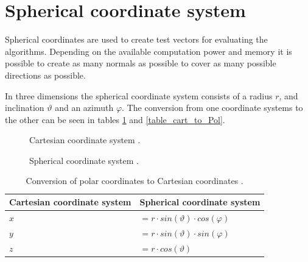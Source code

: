 \section{Spherical coordinate system}
Spherical coordinates are used to create test vectors for evaluating the algorithms. Depending on the available computation power and memory it is possible to create as many normals as possible to cover as many possible directions as possible.

\bigskip
In three dimensions the spherical coordinate system consists of a radius $r$, and inclination $\vartheta$ and an azimuth $\varphi$. The conversion from one coordinate systems to the other can be seen in tables \ref{table_pol_to_cart} and \ref{table_cart_to_Pol}.

\begin{figure}[H]
  \centering
  \begin{minipage}[b]{0.45\textwidth}
    \centering
  \caption{Cartesian coordinate system \cite{Prof.Dr.-Ing.GertF.Trommer2013FelderWellen}.}
  \end{minipage}
  \hfill
  \begin{minipage}[b]{0.45\textwidth}
    \centering
  \caption{Spherical coordinate system \cite{Prof.Dr.-Ing.GertF.Trommer2013FelderWellen}.}
  \end{minipage}
    \hfill
\label{polar_cart_systems}
\end{figure}




\begin{table}[H]
\centering
\begin{tabular}{|ll|}
\hline
\textbf{Cartesian coordinate system} & \textbf{Spherical coordinate system}                                                                            \\ \hline
$x $                            & $= r \cdot sin(\vartheta) \cdot cos(\varphi)$ \\
$y $                            & $= r \cdot sin(\vartheta) \cdot sin(\varphi)$ \\
$z $                            & $= r \cdot cos(\vartheta)$                                                  \\ \hline
\end{tabular}
\caption{Conversion of polar coordinates to Cartesian coordinates  \cite{Bronstein2005TaschenbuchMathematik}.}
\label{table_pol_to_cart}
\end{table}


